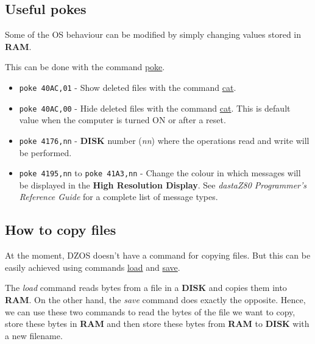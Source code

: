     \subsection{Useful pokes}

    Some of the OS behaviour can be modified by simply changing values stored in
    \textbf{RAM}.
    
    This can be done with the command \hyperref[cmd:poke]{poke}.

    \begin{itemize}
        \item \texttt{poke 40AC,01} - Show deleted files with the command
            \hyperref[cmd:cat]{cat}.
        \item \texttt{poke 40AC,00} - Hide deleted files with the command
            \hyperref[cmd:cat]{cat}. This is default value when the computer is
            turned ON or after a reset.
        \item \texttt{poke 4176,nn} - \textbf{DISK} number (\textit{nn})
            where the operations read and write will be performed.
        \item \texttt{poke 4195,nn} to \texttt{poke 41A3,nn} - Change the 
            colour in which messages will be displayed in the \textbf{High
            Resolution Display}. See \textit{dastaZ80 Programmer's Reference
            Guide}\cite{dastaz80progref} for a complete list of message types.
    \end{itemize}

    \subsection{How to copy files}

    At the moment, DZOS doesn't have a command for copying files. But this can
    be easily achieved using commands \hyperref[cmd:load]{load} and
    \hyperref[cmd:save]{save}.

    The \textit{load} command reads bytes from a file in a \textbf{DISK} and
    copies them into \textbf{RAM}. On the other hand, the \textit{save}
    command does exactly the opposite. Hence, we can  use these two commands to
    read the bytes of the file we want to copy, store these bytes in
    \textbf{RAM} and then store these bytes from \textbf{RAM} to \textbf{DISK}
    with a new filename.

